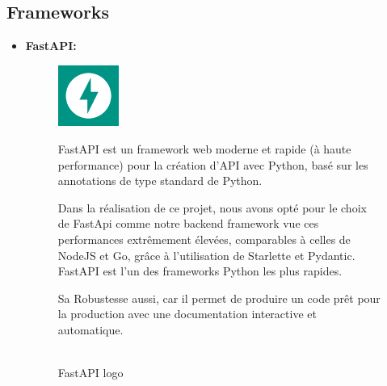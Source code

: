 \subsection {Frameworks}   
    \begin{itemize}
        \item \textbf{FastAPI: }
        \begin{figure}[!htb]\centering
            \begin{minipage}{0.30\textwidth}
            \centering
              {\includegraphics[width = 2cm , height=2cm]{img/techno/fast.png}}
              \caption{ \\ FastAPI logo \cite{fastapi}}\label{Fig:Data1}
            \end{minipage}
            \begin {minipage}{0.60\textwidth}
            \par FastAPI est un framework web moderne et rapide (à haute performance) pour la création d'API avec Python,
            basé sur les annotations de type standard de Python\cite{fastapi}. \\
            \par Dans la réalisation de ce projet, nous avons opté pour le choix de FastApi comme notre backend framework vue ces performances extrêmement élevées, comparables à celles de NodeJS et Go, grâce à l'utilisation de Starlette et Pydantic.
            FastAPI est l'un des frameworks Python les plus rapides.\\
            \par Sa Robustesse aussi, car il permet de produire un code prêt pour la production avec une documentation interactive et automatique.
            

\end{minipage}
\end{figure}
\end{itemize}
